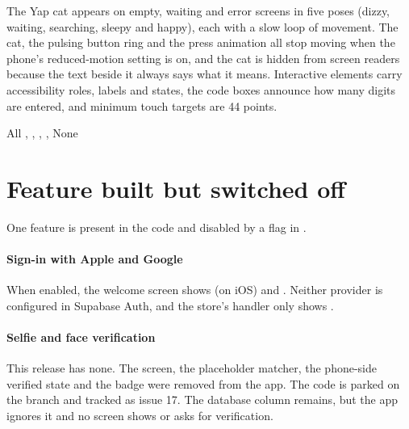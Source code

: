 The Yap cat appears on empty, waiting and error screens in five poses (dizzy, waiting, searching,
sleepy and happy), each with a slow loop of movement. The cat, the pulsing button ring and the press
animation all stop moving when the phone's reduced-motion setting is on, and the cat is hidden from screen
readers because the text beside it always says what it means. Interactive elements carry accessibility
roles, labels and states, the code boxes announce how many digits are entered, and minimum touch targets
are 44 points.

\implemented
  {All}
  {, , , , }
  {None}

\section{Feature built but switched off}
\label{sec:feature-flags}

One feature is present in the code and disabled by a flag in .

\paragraph{Sign-in with Apple and Google} When enabled, the welcome screen shows 
(on iOS) and . Neither provider is configured in Supabase Auth, and the store's
handler only shows .

\paragraph{Selfie and face verification} This release has none. The screen, the placeholder matcher, the
phone-side verified state and the  badge were removed from the app. The code is parked on the
 branch and tracked as issue 17. The database column 
remains, but the app ignores it and no screen shows or asks for verification.
